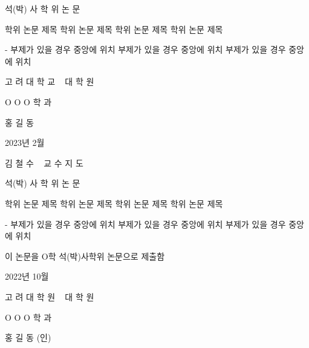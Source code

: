 \documentclass[11pt]{report}
\newcommand\extrasize{\fontsize{16pt}{16pt}\selectfont}  %
\begin{document}
\newpage
\centering
{} %
\extrasize 석(박) 사 학 위 논 문
\par\vspace{3cm} %
\huge 학위 논문 제목  학위 논문 제목   학위 논문 제목  학위 논문 제목 
\par\vspace{0.3cm}\extrasize - 부제가 있을 경우 중앙에 위치 부제가 있을 경우 중앙에 위치 부제가 있을 경우 중앙에 위치
\par\vspace{4.2cm} %
\LARGE 고 려 대 학 교 ~ 대 학 원 \par

\vspace{0.5cm}
\extrasize O O O 학 과 \par
\vspace{0.5cm}
\extrasize 홍 길 동 \par
\vspace{3cm}
\Large 2023년 2월 %

\newpage
\extrasize 김 철 수 ~ 교 수 지 도
\par\vspace{0.5cm}
\extrasize 석(박) 사 학 위 논 문
\par\vspace{2cm}
\huge 학위 논문 제목 학위 논문 제목 학위 논문 제목 학위 논문 제목
\par\vspace{0.3cm}\Large - 부제가 있을 경우 중앙에 위치 부제가 있을 경우 중앙에 위치 부제가 있을 경우 중앙에 위치
\par\vspace{1.7cm} %
\extrasize 이 논문을 O학 석(박)사학위 논문으로 제출함
\par\vspace{2cm} %
\Large 2022년 10월 %
\par\vspace{2cm} %
\LARGE 고 려 대 학 원 ~ 대 학 원
\par\vspace{0.5cm}
\extrasize O O O 학 과
\par\vspace{1cm}
\extrasize 홍 길 동 (인) %
\end{document}
